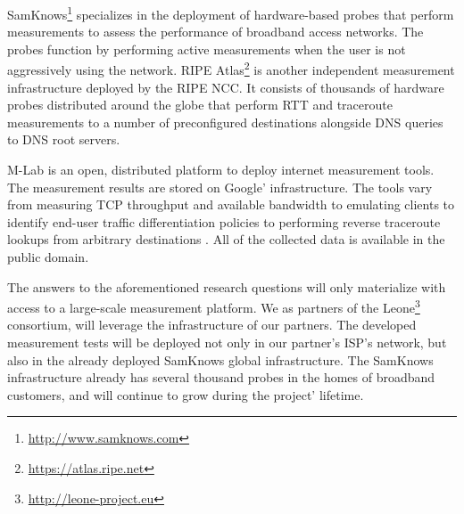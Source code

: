 SamKnows\footnote{\url{http://www.samknows.com}} specializes in the deployment
of hardware-based probes that perform measurements to assess the performance
of broadband access networks. The probes function by performing active
measurements when the user is not aggressively using the network.  RIPE
Atlas\footnote{\url{https://atlas.ripe.net}} is another independent
measurement infrastructure deployed by the \ac{RIPE NCC}. It consists of
thousands of hardware probes distributed around the globe that perform
\ac{RTT} and traceroute measurements to a number of preconfigured destinations
alongside DNS queries to DNS root servers.

\ac{M-Lab} \cite{dovrolis:2010} is an open, distributed platform to deploy
internet measurement tools. The measurement results are stored on Google'
infrastructure. The tools vary from measuring TCP throughput and available
bandwidth to emulating clients to identify end-user traffic differentiation
policies \cite{dischinger:2010, kanuparthy:2011} to performing reverse
traceroute lookups from arbitrary destinations \cite{bassett:2010}.  All of
the collected data is available in the public domain.

The answers to the aforementioned research questions will only materialize
with access to a large-scale measurement platform. We as partners of the
Leone\footnote{\url{http://leone-project.eu}} consortium, will leverage the
infrastructure of our partners. The developed measurement tests will be
deployed not only in our partner's \ac{ISP}'s network, but also in the already
deployed SamKnows global infrastructure.  The SamKnows infrastructure already
has several thousand probes in the homes of broadband customers, and will
continue to grow during the project' lifetime.
